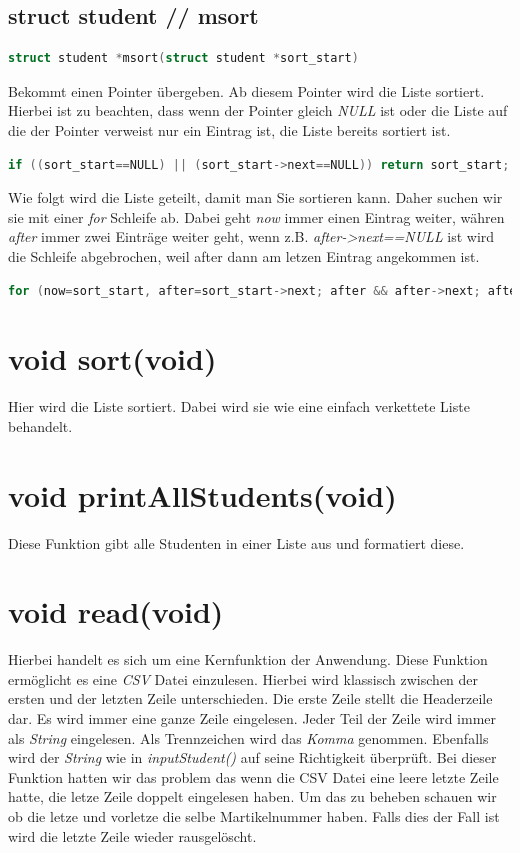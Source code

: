 \documentclass[a4paper, 11pt, oneside]{book} %
\begin{document}
\subsection{struct student // msort}
\begin{lstlisting}[language=C]
	struct student *msort(struct student *sort_start)
\end{lstlisting}
Bekommt einen Pointer übergeben. Ab diesem Pointer wird die Liste sortiert. Hierbei ist zu beachten, dass wenn der Pointer gleich \textit{NULL} ist oder die Liste auf die der Pointer verweist nur ein Eintrag ist, die Liste bereits sortiert ist.
\begin{lstlisting}[language=C]
	if ((sort_start==NULL) || (sort_start->next==NULL)) return sort_start;
\end{lstlisting}
Wie folgt wird die Liste geteilt, damit man Sie sortieren kann. Daher suchen wir sie mit einer \textit{for} Schleife ab. Dabei geht \textit{now} immer einen Eintrag weiter, währen \textit{after} immer zwei Einträge weiter geht, wenn z.B. \textit{after->next==NULL} ist wird die Schleife abgebrochen, weil after dann am letzen Eintrag angekommen ist.
\begin{lstlisting}[language=C]
	for (now=sort_start, after=sort_start->next; after && after->next; after=after->next->next) now=now->next;
\end{lstlisting}

\section{void sort(void)}
Hier wird die Liste sortiert. Dabei wird sie wie eine einfach verkettete Liste behandelt.
\section{void printAllStudents(void)}
Diese Funktion gibt alle Studenten in einer Liste aus und formatiert diese.

\section{void read(void)}
Hierbei handelt es sich um eine Kernfunktion der Anwendung. Diese Funktion ermöglicht es eine \textit{CSV} Datei einzulesen. Hierbei wird klassisch zwischen der ersten und der letzten Zeile unterschieden. Die erste Zeile stellt die Headerzeile dar. Es wird immer eine ganze Zeile eingelesen. Jeder Teil der Zeile wird immer als \textit{String} eingelesen. Als Trennzeichen wird das \textit{Komma} genommen. Ebenfalls wird der \textit{String} wie in \textit{inputStudent()} auf seine Richtigkeit überprüft.
Bei dieser Funktion hatten wir das problem das wenn die CSV Datei eine leere letzte Zeile hatte, die letze Zeile doppelt eingelesen haben. Um das zu beheben schauen wir ob die letze und vorletze die selbe Martikelnummer haben. Falls dies der Fall ist wird die letzte Zeile wieder rausgelöscht.
\end{document}
